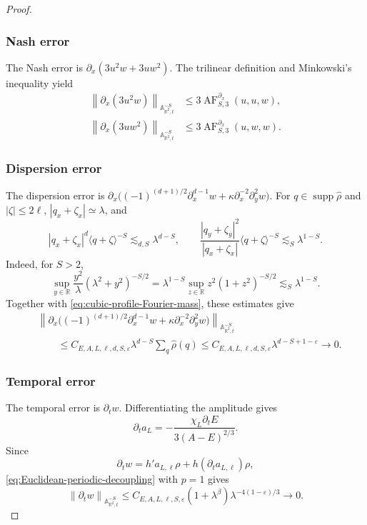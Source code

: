 \documentclass[12pt,reqno,letterpaper]{amsart}
\numberwithin{equation}{section}
\theoremstyle{definition}
\newcommand{\R}{\mathbb R}
\newcommand{\A}{\mathbb A}
\newcommand{\eps}{\varepsilon}
\newcommand{\la}{\lambda}
\newcommand{\supp}{\operatorname{supp}}
\newcommand{\norm}[1]{\left\lVert #1\right\rVert}
\newcommand{\abs}[1]{\left\lvert #1\right\rvert}
\begin{document}
\begin{proof}
\subsubsection*{Nash error}

The Nash error is $\partial_x(3u^2w+3uw^2)$.  The trilinear definition
and Minkowski's inequality yield
\begin{align*}
 \norm{\partial_x(3u^2w)}_{\A^{-S}_{\R^2,t}}
 &\leq3\operatorname{AF}^{\partial_x}_{S,3}(u,u,w),\\
 \norm{\partial_x(3uw^2)}_{\A^{-S}_{\R^2,t}}
 &\leq3\operatorname{AF}^{\partial_x}_{S,3}(u,w,w).
\end{align*}

\subsubsection*{Dispersion error}

The dispersion error is
$\partial_x\bigl((-1)^{(d+1)/2}\partial_x^{d-1}w
+\kappa\partial_x^{-2}\partial_y^2w\bigr)$.
For $q\in\supp\widehat\rho$ and $\abs\zeta\leq2\ell$,
$\abs{q_x+\zeta_x}\simeq\la$, and
\[
 \abs{q_x+\zeta_x}^d\langle q+\zeta\rangle^{-S}
 \lesssim_{d,S}\la^{d-S},
 \qquad
 \frac{\abs{q_y+\zeta_y}^2}{\abs{q_x+\zeta_x}}
 \langle q+\zeta\rangle^{-S}
 \lesssim_S\la^{1-S}.
\]
Indeed, for $S>2$,
\[
 \sup_{y\in\R}\frac{y^2}{\la}(\la^2+y^2)^{-S/2}
 =\la^{1-S}\sup_{z\in\R}z^2(1+z^2)^{-S/2}
 \lesssim_S\la^{1-S}.
\]
Together with
\eqref{eq:cubic-profile-Fourier-mass}, these estimates give
\begin{equation*}
 \begin{aligned}
 &\norm{\partial_x\bigl((-1)^{(d+1)/2}\partial_x^{d-1}w+
 \kappa\partial_x^{-2}\partial_y^2w\bigr)}_{\A^{-S}_{\R^2,t}}\\
 &\qquad\leq C_{E,A,L,\ell,d,S,\eps}
 \la^{d-S}\sum_q\widehat\rho(q)
 \leq C_{E,A,L,\ell,d,S,\eps}\la^{d-S+1-\eps}
 \longrightarrow0.
 \end{aligned}
\end{equation*}

\subsubsection*{Temporal error}

The temporal error is $\partial_tw$.  Differentiating the amplitude gives
\[
 \partial_ta_L=-\frac{\chi_L\partial_tE}{3(A-E)^{2/3}}.
\]
Since
\[
 \partial_tw=h'a_{L,\ell}\rho
 +h(\partial_ta_{L,\ell})\rho,
\]
\eqref{eq:Euclidean-periodic-decoupling} with $p=1$ gives
\begin{equation*}
 \norm{\partial_tw}_{\A^{-S}_{\R^2,t}}
 \leq C_{E,A,L,\ell,S,\eps}
 (1+\la^\beta)
 \la^{-4(1-\eps)/3}\longrightarrow0.
\end{equation*}


\end{proof}
\end{document}
